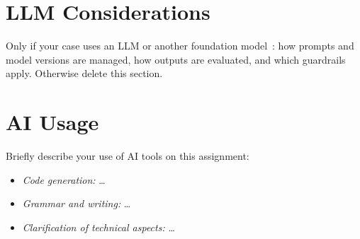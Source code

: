 \documentclass[report]{itvest}
\begin{document}
\section{LLM Considerations}

Only if your case uses an LLM or another foundation
model~\cite{bass_engineering_2025}: how prompts and model versions are
managed, how outputs are evaluated, and which guardrails apply. Otherwise
delete this section.

\section{AI Usage}

Briefly describe your use of AI tools on this assignment:

\begin{itemize}
  \item \emph{Code generation:} \ldots
  \item \emph{Grammar and writing:} \ldots
  \item \emph{Clarification of technical aspects:} \ldots
\end{itemize}



\end{document}
